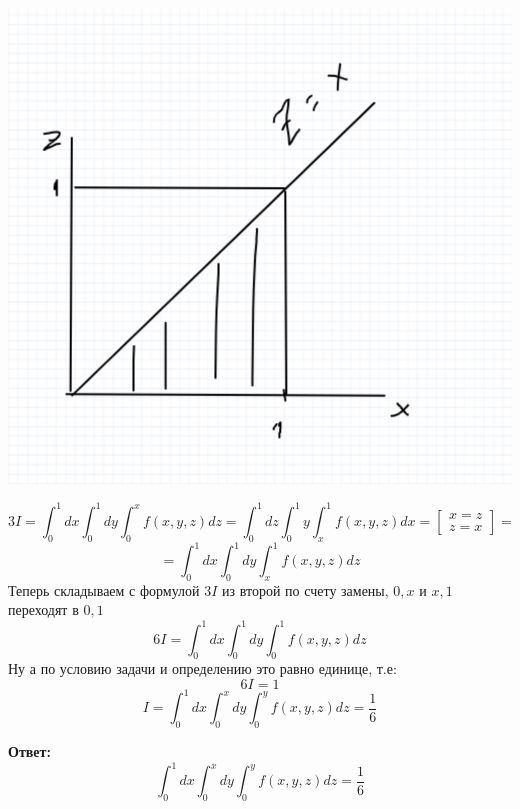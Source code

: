 \documentclass[a4paper,12pt]{article}
\begin{document}
\begin{center}
\includegraphics[scale=0.2]{5.png}
\end{center}
\[
3I = \int_0^1 dx \int_0^1 dy \int_0^x f(x, y, z) dz  = \int_0^1 dz \int_0^1 y \int_x^1 f(x, y, z) dx = \begin{bmatrix}
x = z \\
z = x
\end{bmatrix} = 
\]
\[
=
\int_0^1 dx \int_0^1 dy \int_x^1 f(x, y, z) dz
\]
Теперь складываем с формулой $3I$ из второй по счету замены, $0, x$ и $x, 1$ переходят в $0, 1$
\[
6I = \int_0^1dx \int_0^1 dy \int_0^1 f(x, y, z) dz
\]
Ну а по условию задачи и определению это равно единице, т.е:
\[
6I = 1
\]
\[
I =\int_0^1 dx \int_0^x dy \int_0^y f(x, y, z) dz  = \frac{1}{6}
\]
\begin{center}
\textbf{Ответ: } \[
\int_0^1 dx \int_0^x dy \int_0^y f(x, y, z) dz  = \frac{1}{6}
\]
\end{center}
\end{document}
